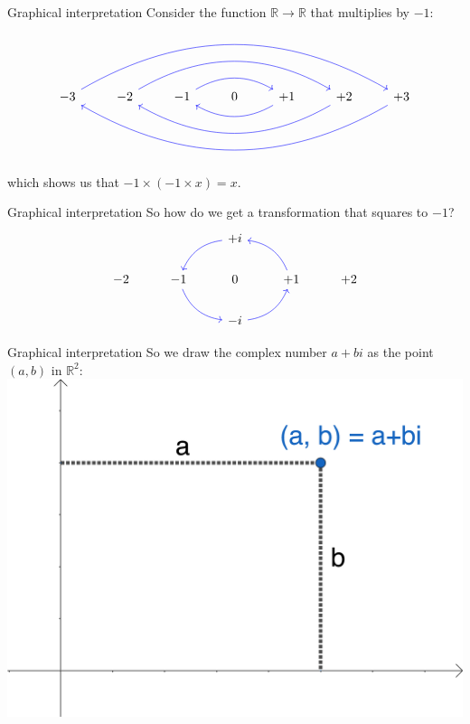 \documentclass{beamer}
\begin{document}
\begin{frame}[fragile]{Graphical interpretation}
Consider the function $\mathbb{R} \rightarrow \mathbb{R}$ that multiplies by $-1$:
\begin{equation*}
\begin{tikzcd}
-3\arrow[bend left, color = blue]{rrrrrr} & -2\arrow[bend left, color = blue]{rrrr} & -1 \arrow[bend left, color = blue]{rr} & 0 & +1\arrow[bend left, color = blue]{ll} & +2\arrow[bend left, color = blue]{llll} & +3\arrow[bend left, color = blue]{llllll}\\
\end{tikzcd}
\end{equation*}
which shows us that $-1\times(-1\times x) = x$.
\end{frame}

\begin{frame}[fragile]{Graphical interpretation}
So how do we get a transformation that squares to $-1$?
\begin{equation*}
\begin{tikzcd}
{} & {} & +i \arrow[bend right, color = blue]{dl} & {} & {}\\
-2 & -1\arrow[bend right, color = blue]{dr} & 0 & +1 \arrow[bend right, color = blue]{ul} & +2\\
{} & {} & -i\arrow[bend right, color = blue]{ur} & {} & {}
\end{tikzcd}
\end{equation*}
\end{frame}

\begin{frame}[fragile]{Graphical interpretation}
So we draw the complex number $a+bi$ as the point $(a, b)$ in $\mathbb{R}^2$:
\includegraphics{complex-plane.png}
\end{frame}
\end{document}

